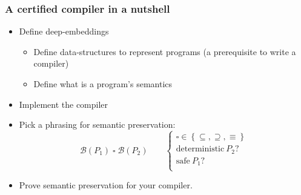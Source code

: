 \documentclass[9pt]{beamer}
\begin{document}
\begin{frame}[fragile]
  \frametitle{A certified compiler in a nutshell}
  \newcommand\behaviors[1]{{\mathcal B}\left(#1\right)}
  \begin{itemize}
  \item Define \alert{deep-embeddings}
    \begin{itemize}
    \item Define data-structures to represent programs (a prerequisite to write a compiler)
    \item Define what is a program's semantics 
    \end{itemize}
    
    \pause
    
  \item Implement the compiler

    \pause

  \item Pick a phrasing for semantic preservation:
    \begin{displaymath}
      \behaviors{P_1} \mathbin{\square} \behaviors{P_2} 
      \qquad  \begin{cases}
        \square \in \left\{\subseteq, \supseteq, \equiv \right\} \\
        \text{deterministic}~P_2 ? \\
        \text{safe}~P_1 ? \\
      \end{cases}
    \end{displaymath}

    \pause

  \item Prove semantic preservation for your compiler. 
    \pause {}
  \end{itemize}  
\end{frame}
\end{document}
